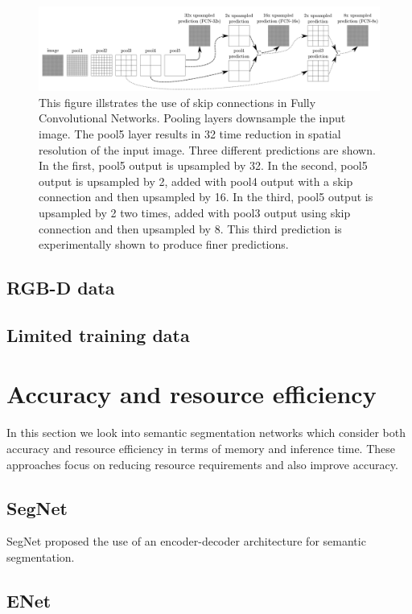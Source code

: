 	\begin{figure}
		\centering
		\includegraphics[width=1\linewidth]{images/fcn_skip}
		\caption{This figure illstrates the use of skip connections in Fully Convolutional Networks. Pooling layers downsample the input image. The pool5 layer results in 32 time reduction in spatial resolution of the input image. Three different predictions are shown. In the first, pool5 output is upsampled by 32. In the second, pool5 output is upsampled by 2, added with pool4 output with a skip connection and then upsampled by 16. In the third, pool5 output is upsampled by 2 two times, added with pool3 output using skip connection and then upsampled by 8. This third prediction is experimentally shown to produce finer predictions.}
		\label{Fig:fcn}
	\end{figure}

\subsection{RGB-D data}

\subsection{Limited training data}

\section{Accuracy and resource efficiency}
\label{section:acceff}

In this section we look into semantic segmentation networks which consider both accuracy and resource efficiency in terms of memory and inference time. These approaches focus on reducing resource requirements and also improve accuracy.

\subsection{SegNet}

SegNet proposed the use of an encoder-decoder architecture for semantic segmentation. 

\subsection{ENet}

